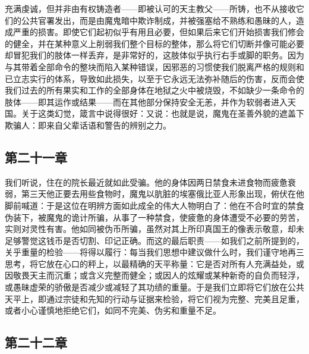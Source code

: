 充满虔诚，但并非由有权铸造者——即被认可的天主教父——所铸，也不从接收它们的公共官署发出，而是由魔鬼暗中欺诈制成，并被强塞给不熟练和愚昧的人，造成严重的损害。即使它们起初似乎有用且必要，但如果后来它们开始损害我们修会的健全，并在某种意义上削弱我们整个目标的整体，那么将它们切断并像可能必要却冒犯我们的肢体一样丢弃，是非常好的，这肢体似乎执行右手或脚的职务。因为与其带着全部命令的整块而陷入某种错误，因邪恶的习惯使我们脱离严格的规则和已立志实行的体系，导致如此损失，以至于它永远无法弥补随后的伤害，反而会使我们过去的所有果实和工作的全部身体在地狱之火中被烧毁，不如缺少一条命令的肢体——即其运作或结果——而在其他部分保持安全无恙，并作为软弱者进入天国。关于这类幻觉，箴言中说得很好：又说：也就是说，魔鬼在圣善外貌的遮盖下欺骗人：即来自父辈话语和警告的辨别之力。\par


\subsection{第二十一章}

\par

我们听说，住在的院长最近就如此受骗。他的身体因两日禁食未进食物而疲惫衰弱，第三天他正要去用些食物时，魔鬼以肮脏的埃塞俄比亚人形象出现，俯伏在他脚前喊道：于是这位在明辨方面如此成全的伟大人物明白了：他在不合时宜的禁食伪装下，被魔鬼的诡计所骗，从事了一种禁食，使疲惫的身体遭受不必要的劳苦，实则对灵性有害。他如同被伪币所骗，虽然对其上所印真国王的像表示敬意，却未足够警觉这钱币是否切割、印记正确。而这的最后职责——如我们之前所提到的，关乎重量的检验——将得以履行：每当我们思想中建议做什么时，我们谨守地再三思考，将它放在心口的秤上，以最精确的天平称量：它是否对所有人充满益处，或因敬畏天主而沉重；或含义完整而健全；或因人的炫耀或某种新奇的自负而轻浮，或愚昧虚荣的骄傲是否减少或减轻了其功绩的重量。于是我们立即将它们放在公共天平上，即通过宗徒和先知的行动与证据来检验，将它们视为完整、完美且足重，或者小心谨慎地拒绝它们，如同不完美、伪劣和重量不足。\par


\subsection{第二十二章}

